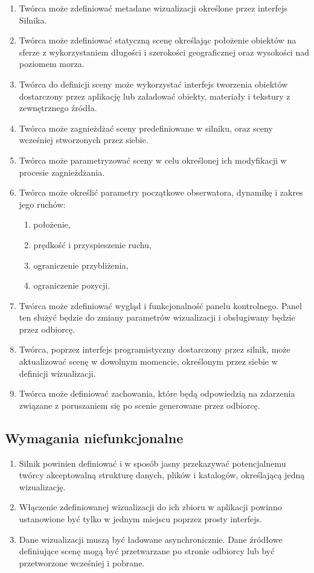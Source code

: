\begin{enumerate}
    \item Twórca może zdefiniować metadane wizualizacji określone przez interfejs Silnika.
    \item Twórca może zdefiniować statyczną scenę określając położenie obiektów na sferze z wykorzystaniem
          długości i szerokości geograficznej oraz wysokości nad poziomem morza.
    \item Twórca do definicji sceny może wykorzystać interfejs tworzenia obiektów dostarczony przez aplikację
          lub załadować obiekty, materiały i tekstury z zewnętrznego źródła.
    \item Twórca może zagnieżdżać sceny predefiniowane w silniku, oraz sceny wcześniej stworzonych przez siebie.
    \item Twórca może parametryzować sceny w celu określonej ich modyfikacji w procesie zagnieżdżania.
    \item Twórca może określić parametry początkowe obserwatora, dynamikę i zakres jego ruchów:
          \begin{enumerate}
              \item położenie,
              \item prędkość i przyspieszenie ruchu,
              \item ograniczenie przybliżenia,
              \item ograniczenie pozycji.
          \end{enumerate}
    \item Twórca może zdefiniować wygląd i funkcjonalność panelu kontrolnego.
          Panel ten służyć będzie do zmiany parametrów wizualizacji i obsługiwany będzie przez odbiorcę.
    \item Twórca, poprzez interfejs programistyczny dostarczony przez silnik, może aktualizować scenę w dowolnym momencie, określonym przez siebie w definicji wizualizacji.
    \item Twórca może definiować zachowania, które będą odpowiedzią na zdarzenia związane z poruszaniem się po scenie generowane przez odbiorcę.
\end{enumerate}

\subsection{Wymagania niefunkcjonalne}

\begin{enumerate}
    \item Silnik powinien definiować i w sposób jasny przekazywać potencjalnemu twórcy akceptowalną strukturę danych, plików i katalogów, określającą jedną wizualizację.
    \item Włączenie zdefiniowanej wizualizacji do ich zbioru w aplikacji powinno ustanowione być tylko w jednym miejscu poprzez prosty interfejs.
    \item Dane wizualizacji muszą być ładowane asynchronicznie. Dane źródłowe definiujące scenę mogą być przetwarzane po stronie odbiorcy lub być przetworzone wcześniej i pobrane.
\end{enumerate}

